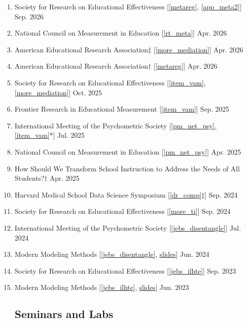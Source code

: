 \documentclass[11pt]{article}
\begin{document}
\begin{enumerate}
\item Society for Research on Educational Effectiveness [\ref{metareg}, \ref{app_meta2}] \hfill Sep. 2026
\item National Council on Measurement in Education [\ref{rt_meta}] \hfill Apr. 2026
\item American Educational Research Association$\ddagger$ [\ref{more_mediation}] \hfill Apr. 2026
\item American Educational Research Association$\dagger$ [\ref{metareg}] \hfill Apr. 2026
\item Society for Research on Educational Effectiveness [\ref{item_vam}, \ref{more_mediation}] \hfill Oct. 2025
\item Frontier Research in Educational Measurement [\ref{item_vam}] \hfill Sep. 2025
\item International Meeting of the Psychometric Society [\ref{pm_net_psy}, \ref{item_vam}*] \hfill Jul. 2025
    \item National Council on Measurement in Education [\ref{pm_net_psy}] \hfill Apr. 2025 
    \item How Should We Transform School Instruction to Address the Needs of All Students?$\dagger$ \hfill Apr. 2025
        \item Harvard Medical School Data Science Symposium [\ref{dr_comp}$\ddagger$] \hfill Sep. 2024 
    \item Society for Research on Educational Effectiveness [\ref{more_ti}] \hfill Sep. 2024
    \item International Meeting of the Psychometric Society [\ref{jebs_disentangle}] \hfill Jul. 2024
    \item Modern Modeling Methods [\ref{jebs_disentangle}, \href{https://modeling.media.uconn.edu/wp-content/uploads/sites/1188/2024/07/Disentangling-Person-Dependent-and-Item-Dependent-Causal-Effects-copy.pdf}{slides}] \hfill Jun. 2024
    \item Society for Research on Educational Effectiveness [\ref{jebs_ilhte}] \hfill Sep. 2023 
    \item Modern Modeling Methods [\ref{jebs_ilhte}, \href{https://modeling.uconn.edu/wp-content/uploads/sites/1188/2023/06/Gilbert_IL-HTE-Slides.pdf}{slides}] \hfill Jun. 2023

\subsection{Seminars and Labs}


\end{enumerate}
\end{document}

